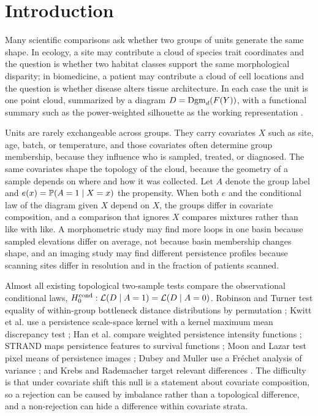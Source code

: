 \section{Introduction}
\label{sec:intro}

Many scientific comparisons ask whether two groups of units generate the same shape. In ecology, a site may contribute a cloud of species trait coordinates and the question is whether two habitat classes support the same morphological disparity; in biomedicine, a patient may contribute a cloud of cell locations and the question is whether disease alters tissue architecture. In each case the unit is one point cloud, summarized by a diagram $D = \mathrm{Dgm}_d(F(Y))$, with a functional summary such as the power-weighted silhouette as the working representation \cite{kim_lee_tce_2026,chazal_socg_2014,bubenik_jmlr_2015,berry_jact_2020}.

Units are rarely exchangeable across groups. They carry covariates $X$ such as site, age, batch, or temperature, and those covariates often determine group membership, because they influence who is sampled, treated, or diagnosed. The same covariates shape the topology of the cloud, because the geometry of a sample depends on where and how it was collected. Let $A$ denote the group label and $e(x) = \mathbb{P}(A=1 \mid X=x)$ the propensity. When both $e$ and the conditional law of the diagram given $X$ depend on $X$, the groups differ in covariate composition, and a comparison that ignores $X$ compares mixtures rather than like with like. A morphometric study may find more loops in one basin because sampled elevations differ on average, not because basin membership changes shape, and an imaging study may find different persistence profiles because scanning sites differ in resolution and in the fraction of patients scanned.

Almost all existing topological two-sample tests compare the observational conditional laws, $H_0^{\mathrm{cond}}: \mathcal{L}(D \mid A=1) = \mathcal{L}(D \mid A=0)$. Robinson and Turner test equality of within-group bottleneck distance distributions by permutation \cite{robinson_turner_2017}; Kwitt et al. use a persistence scale-space kernel with a kernel maximum mean discrepancy test \cite{kwitt_neurips_2015,gretton_2012}; Han et al. compare weighted persistence intensity functions \cite{han_kim_kim_2026}; STRAND maps persistence features to survival functions \cite{murris_strand_2026}; Moon and Lazar test pixel means of persistence images \cite{moon_lazar_2023}; Dubey and Muller use a Fr\'echet analysis of variance \cite{dubey_muller_2019}; and Krebs and Rademacher target relevant differences \cite{krebs_rademacher_2024}. The difficulty is that under covariate shift this null is a statement about covariate composition, so a rejection can be caused by imbalance rather than a topological difference, and a non-rejection can hide a difference within covariate strata.

